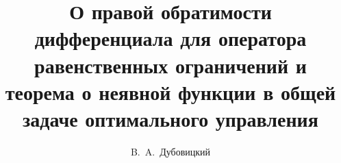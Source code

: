 


\usepackage[russian]{nla}

%
%


%




%
\fi

\title{О правой обратимости дифференциала для оператора равенственных ограничений и теорема о неявной функции в общей задаче оптимального управления}
\author{B.~A.~Дубовицкий %
} %


\maketitle

